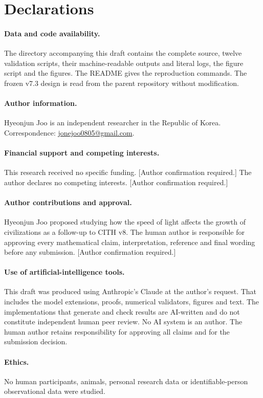 \documentclass[11pt,a4paper]{article}
\theoremstyle{definition}
\newcommand{\CITH}{\textsc{CITH}}
\begin{document}
\section*{Declarations}
\paragraph{Data and code availability.}
The directory accompanying this draft contains the complete source, twelve
validation scripts, their machine-readable outputs and literal logs, the
figure script and the figures. The README gives the reproduction commands.
The frozen v7.3 design is read from the parent repository without
modification.
\paragraph{Author information.}
Hyeonjun Joo is an independent researcher in the Republic of Korea.
Correspondence: \href{mailto:jonejoo0805@gmail.com}{jonejoo0805@gmail.com}.
\paragraph{Financial support and competing interests.}
This research received no specific funding.
\textup{[Author confirmation required.]}
The author declares no competing interests.
\textup{[Author confirmation required.]}
\paragraph{Author contributions and approval.}
Hyeonjun Joo proposed studying how the speed of light affects the growth of
civilizations as a follow-up to \CITH{} v8. The human author is responsible
for approving every mathematical claim, interpretation, reference and final
wording before any submission.
\textup{[Author confirmation required.]}
\paragraph{Use of artificial-intelligence tools.}
This draft was produced using Anthropic's Claude at the author's request. That
includes the model extensions, proofs, numerical validators, figures and text.
The implementations that generate and check results are AI-written and do not
constitute independent human peer review. No AI system is an author. The human
author retains responsibility for approving all claims and for the submission
decision.
\paragraph{Ethics.}
No human participants, animals, personal research data or identifiable-person
observational data were studied.
\end{document}
